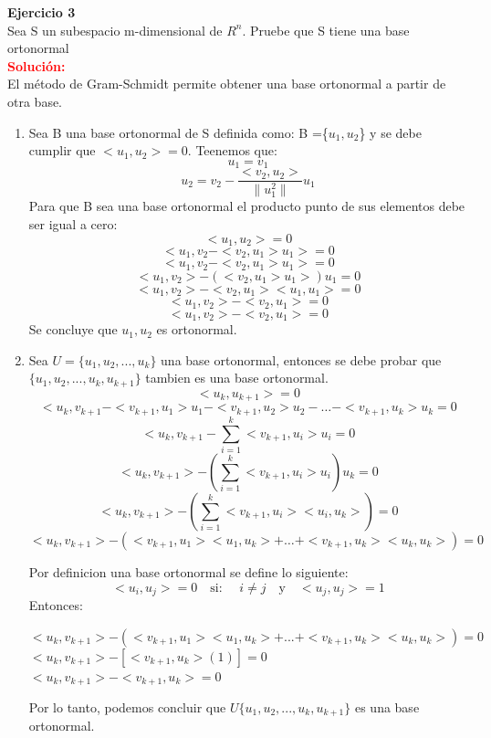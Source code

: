 \documentclass[12pt]{article}
\begin{document}
\begin{enumerate}
  \end{enumerate} 
\noindent \textbf{Ejercicio 3}\\
Sea S un subespacio m-dimensional  de $R^n$. Pruebe que S tiene una base ortonormal \\

\noindent \textcolor{red}{\bf Solución:} \\
 El método de Gram-Schmidt permite obtener una base ortonormal a partir de otra base.
\begin{enumerate}
    \item Sea B una base ortonormal de S definida como: B =\{$u_1,u_2$\} y se debe cumplir que $<u_{1},u_{2}> = 0$. Teenemos que:
          \[u_{1} = v_{1}\]
          \[u_{2} = v_{2} - \frac{<v_{2}, u_{2}>}{\|u_{1}^{2}\|}u_{1}\]
           Para que B sea una base ortonormal el producto punto de sus elementos debe ser igual a cero:
           \[<u_{1}, u_{2}> = 0 \]
           \[<u_{1}, v_{2} - <v_{2},u_{1}>u_{1}> = 0 \]
           \[<u_{1}, v_{2} - <v_{2},u_{1}>u_{1}> = 0 \]
           \[<u_{1}, v_{2}> - (<v_{2},u_{1}>u_{1}>)u_{1} = 0 \]
           \[<u_{1}, v_{2}> - <v_{2},u_{1}><u_{1},u_{1}> = 0 \]
           \[<u_{1}, v_{2}> - <v_{2},u_{1}> = 0 \]
           \[<u_{1}, v_{2}> - <v_{2},u_{1}> = 0 \]
           Se concluye que {$u_1,u_2$} es ortonormal.\\
        
         \item Sea  $U=\{u_{1}, u_{2}, ... , u_{k}\}$  una base ortonormal, entonces se debe probar que $\{u_{1}, u_{2}, ... , u_{k}, u_{k+1}\}$  tambien es una base ortonormal.
        \[<u_{k}, u_{k + 1}> = 0\]
        \[<u_{k}, v_{k + 1} - <v_{k + 1}, u_{1}>u_{1} - <v_{k + 1}, u_{2}>u_{2}  - \dots - <v_{k + 1}, u_{k}>u_{k}  = 0\]
        \[<u_{k}, v_{k + 1} - \sum^{k}_{i = 1}<v_{k + 1}, u_{i}>u_{i}  = 0\]
        \[<u_{k}, v_{k + 1}> - (\sum^{k}_{i = 1}<v_{k + 1}, u_{i}>u_{i}) u_{k}  = 0\]
        \[<u_{k}, v_{k + 1}> - (\sum^{k}_{i = 1}<v_{k + 1}, u_{i}><u_{i}, u_{k}>)  = 0\]
        \[<u_{k}, v_{k + 1}> - (<v_{k + 1}, u_{1}><u_{1}, u_{k}> + \dots + <v_{k + 1}, u_{k}><u_{k}, u_{k}>)  = 0\]
            
        Por definicion una base ortonormal se define lo siguiente: $$<u_{i}, u_{j}>  = 0  \quad \text{si: } \quad i \ne j  \quad \text{y}\quad <u_{j}, u_{j}>  = 1 $$ 
        Entonces:
        \begin{center}
          $<u_{k}, v_{k + 1}> - (<v_{k + 1}, u_{1}><u_{1}, u_{k}>  + ... + <v_{k + 1}, u_{k}><u_{k}, u_{k}>)  = 0$\\
          $<u_{k}, v_{k + 1}> - [ <v_{k + 1}, u_{k}>(1)]  = 0$\\
          $<u_{k}, v_{k + 1}> - <v_{k + 1}, u_{k}>  = 0$
        \end{center}
         
        Por lo tanto, podemos concluir que $U\{u_{1}, u_{2}, ... , u_{k}, u_{k+1}\}$ es una base ortonormal.
\end{enumerate}
\end{document}
